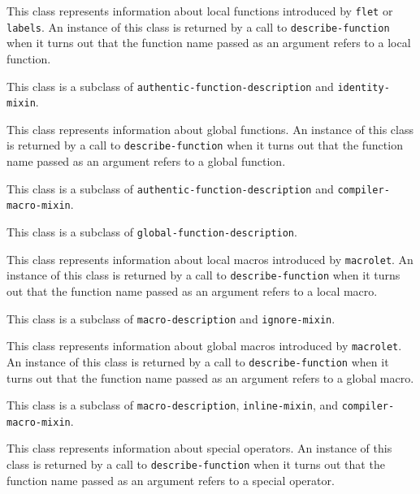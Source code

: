 {\footnotesize
{}
}

This class represents information about local functions introduced by
\texttt{flet} or \texttt{labels}.  An instance of this class is
returned by a call to \texttt{describe-function} when it turns out that
the function name passed as an argument refers to a local function.

This class is a subclass of \texttt{authentic-function-description} and
\texttt{identity-mixin}.

{\footnotesize
{}
}

This class represents information about global functions.  An instance
of this class is returned by a call to \texttt{describe-function} when it
turns out that the function name passed as an argument refers to a
global function.

This class is a subclass of \texttt{authentic-function-description} and
\texttt{compiler-macro-mixin}.

{\footnotesize
{}
}

This class is a subclass of \texttt{global-function-description}.

{\footnotesize
{}
}

This class represents information about local macros introduced by
\texttt{macrolet}.  An instance of this class is returned by a call to
\texttt{describe-function} when it turns out that the function name passed
as an argument refers to a local macro.

This class is a subclass of \texttt{macro-description} and
\texttt{ignore-mixin}.

{\footnotesize
{}
}

This class represents information about global macros introduced by
\texttt{macrolet}.  An instance of this class is returned by a call to
\texttt{describe-function} when it turns out that the function name passed
as an argument refers to a global macro.

This class is a subclass of \texttt{macro-description},
\texttt{inline-mixin}, and \texttt{compiler-macro-mixin}.

{\footnotesize
{}
}

This class represents information about special operators.  An
instance of this class is returned by a call to \texttt{describe-function}
when it turns out that the function name passed as an argument refers
to a special operator.

